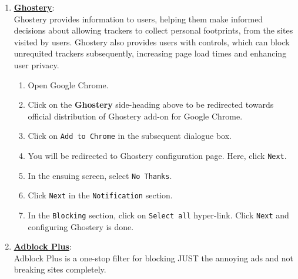\documentclass[12pt]{extarticle}
\begin{document}
	\vspace{2mm}
	\noindent
	\begin{enumerate}
	\item	\href{https://chrome.google.com/webstore/detail/ghostery/mlomiejdfkolichcflejclcbmpeaniij?hl=en}{\textbf{\underline{Ghostery}}}:\\
	Ghostery provides information to users, helping them make informed decisions about allowing trackers to collect personal footprints, from the sites visited by users. Ghostery also provides users with controls, which can block unrequited trackers subsequently, increasing page load times and enhancing user privacy. 
	
	\begin{enumerate}
		\item Open Google Chrome.
		\item Click on the \textbf{Ghostery} side-heading above to be redirected towards official distribution of Ghostery add-on for Google Chrome.
		\item Click on \texttt{Add to Chrome} in the subsequent dialogue box.
		\item You will be redirected to Ghostery configuration page. Here, click \texttt{Next}.
		\item In the ensuing screen, select \texttt{No Thanks}.
		\item Click \texttt{Next} in the \texttt{Notification} section.
		\item In the \texttt{Blocking} section, click on \texttt{Select all} hyper-link. Click \texttt{Next} and configuring Ghostery is done.
	\end{enumerate} 
	
	\vspace{2mm}
	\noindent
	\item	\href{https://chrome.google.com/webstore/detail/adblock-plus/cfhdojbkjhnklbpkdaibdccddilifddb?hl=en-US}{\textbf{\underline{Adblock Plus}}}:\\
	Adblock Plus is a one-stop filter for blocking JUST the annoying ads and not breaking sites completely.
	

\end{enumerate}
\end{document}
